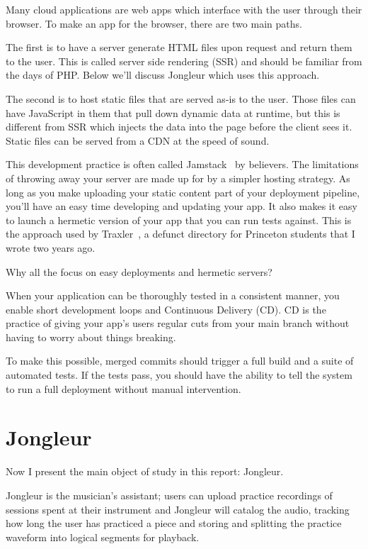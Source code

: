 \documentclass{article}
\newcommand{\infobox}[2]{
  \begin{tcolorbox}[width=\textwidth,colback={white},title={\strut\textbf{#1}},colbacktitle=blue!15,coltitle=black,boxrule=0.2pt,parbox=false]
    #2
  \end{tcolorbox}
}
\begin{document}
Many cloud applications are web apps which interface with the user through their browser.
To make an app for the browser, there are two main paths.

The first is to have a server generate HTML files upon request and return them to the user.
This is called server side rendering (SSR) and should be familiar from the days of PHP.
Below we'll discuss Jongleur which uses this approach.

The second is to host static files that are served as-is to the user.
Those files can have JavaScript in them that pull down dynamic data at runtime, but this is different from SSR which injects the data into the page before the client sees it.
Static files can be served from a CDN at the speed of sound.

This development practice is often called Jamstack~\cite{jamstack} by believers.
The limitations of throwing away your server are made up for by a simpler hosting strategy.
As long as you make uploading your static content part of your deployment pipeline, you'll have an easy time developing and updating your app.
It also makes it easy to launch a hermetic version of your app that you can run tests against.
This is the approach used by Traxler~\cite{traxler}, a defunct directory for Princeton students that I wrote two years ago.

\infobox{Continuous delivery}{
  Why all the focus on easy deployments and hermetic servers?
  
  When your application can be thoroughly tested in a consistent manner, you enable short development loops and Continuous Delivery (CD).
  CD is the practice of giving your app's users regular cuts from your main branch without having to worry about things breaking.

  To make this possible, merged commits should trigger a full build and a suite of automated tests.
  If the tests pass, you should have the ability to tell the system to run a full deployment without manual intervention.
}

\section{Jongleur}
\label{JONG}

Now I present the main object of study in this report: Jongleur.

Jongleur is the musician's assistant; users can upload practice recordings of sessions spent at their instrument and Jongleur will catalog the audio, tracking how long the user has practiced a piece and storing and splitting the practice waveform into logical segments for playback.
\end{document}
